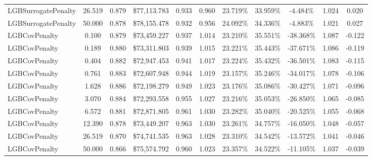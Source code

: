 \documentclass[12pt, draft]{article}
\theoremstyle{plain}
\theoremstyle{definition}
\newcommand{\1}{\mathbf{1}}
\begin{document}
\begin{table}[!htbp]
{\begin{tabular}{lc|cc|cc|cc|ccc}
LGBSurrogatePenalty & 26.519 & 0.879 & \$77{,}113.783 & 0.933 & 0.960 & 23.719\% & 33.959\% & -4.484\% & 1.024 & 0.020 \\
LGBSurrogatePenalty & 50.000 & 0.878 & \$78{,}155.478 & 0.932 & 0.956 & 24.092\% & 34.336\% & -4.883\% & 1.021 & 0.027 \\
\midrule
LGBCovPenalty & 0.100 & 0.879 & \$73{,}459.227 & 0.937 & 1.014 & 23.210\% & 35.551\% & -38.368\% & 1.087 & -0.122 \\
LGBCovPenalty & 0.189 & 0.880 & \$73{,}311.803 & 0.939 & 1.015 & 23.221\% & 35.443\% & -37.671\% & 1.086 & -0.119 \\
LGBCovPenalty & 0.404 & 0.882 & \$72{,}947.453 & 0.941 & 1.017 & 23.224\% & 35.432\% & -36.501\% & 1.083 & -0.115 \\
LGBCovPenalty & 0.761 & 0.883 & \$72{,}607.948 & 0.944 & 1.019 & 23.157\% & 35.246\% & -34.017\% & 1.078 & -0.106 \\
LGBCovPenalty & 1.628 & 0.886 & \$72{,}198.279 & 0.949 & 1.023 & 23.176\% & 35.086\% & -30.427\% & 1.071 & -0.096 \\
LGBCovPenalty & 3.070 & 0.884 & \$72{,}293.558 & 0.955 & 1.027 & 23.216\% & 35.053\% & -26.850\% & 1.065 & -0.085 \\
LGBCovPenalty & 6.572 & 0.881 & \$72{,}871.805 & 0.961 & 1.030 & 23.282\% & 35.040\% & -20.525\% & 1.055 & -0.068 \\
LGBCovPenalty & 12.390 & 0.878 & \$73{,}449.207 & 0.963 & 1.030 & 23.261\% & 34.757\% & -16.050\% & 1.048 & -0.057 \\
LGBCovPenalty & 26.519 & 0.870 & \$74{,}741.535 & 0.963 & 1.028 & 23.310\% & 34.542\% & -13.572\% & 1.041 & -0.046 \\
LGBCovPenalty & 50.000 & 0.866 & \$75{,}574.792 & 0.960 & 1.023 & 23.357\% & 34.522\% & -11.105\% & 1.037 & -0.039 \\
\bottomrule
\end{tabular}}
\end{table}
\end{document}
